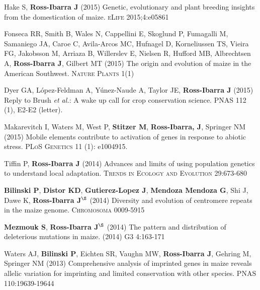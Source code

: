 \documentclass[letterpaper]{article}
\begin{document}
\begin{etaremune}
\item Hake S, {\bf Ross-Ibarra J} (2015) Genetic, evolutionary and plant breeding insights from the domestication of maize. \textsc{eLife}  2015;4:e05861
\vspace{-2ex}
\item Fonseca RR, Smith B, Wales N, Cappellini E, Skoglund P, Fumagalli M, Samaniego JA, Caroe C, Avila-Arcos MC, Hufnagel D, Korneliussen TS, Vieira FG, Jakobsson M, Arriaza B, Willerslev E, Nielsen R, Hufford MB, Albrechtsen A,  {\bf Ross-Ibarra J}, Gilbert MT (2015) The origin and evolution of maize in the American Southwest. \textsc{Nature Plants} 1(1)
\vspace{-2ex}
\item Dyer GA, L\'opez-Feldman A, Y\'unez-Naude A, Taylor JE, {\bf Ross-Ibarra J} (2015) Reply to Brush \emph{et al.}: A wake up call for crop conservation science. PNAS 112 (1), E2-E2 (letter).
\vspace{-2ex}
\item Makarevitch I, Waters M, West P, {\bf Stitzer M}, {\bf Ross-Ibarra, J}, Springer NM (2015) Mobile elements contribute to activation of genes in response to abiotic stress. \textsc{PLoS Genetics} 11 (1): e1004915. %
\vspace{-2ex}
\item Tiffin P, {\bf Ross-Ibarra J} (2014) Advances and limits of using population genetics to understand local adaptation. \textsc{Trends in Ecology and Evolution} 29:673-680 %

\item {\bf Bilinski P}, {\bf Distor KD}, {\bf Gutierez-Lopez J}, {\bf Mendoza Mendoza G}, Shi J, Dawe K,  {\bf Ross-Ibarra J}$^\S$ (2014) Diversity and evolution of centromere repeats in the maize genome. \textsc{Chromosoma} 0009-5915

\item {\bf Mezmouk S}, {\bf Ross-Ibarra J}$^\S$ (2014) The pattern and distribution of deleterious mutations in maize. (2014) \textsc{G3} 4:163-171

\item Waters AJ, {\bf Bilinski P}, Eichten SR, Vaughn MW, {\bf Ross-Ibarra J}, Gehring M, Springer NM (2013) Comprehensive analysis of imprinted genes in maize reveals allelic variation for imprinting and limited conservation with other species. \textsc{PNAS} 110:19639-19644 


\end{etaremune}
\end{document}
